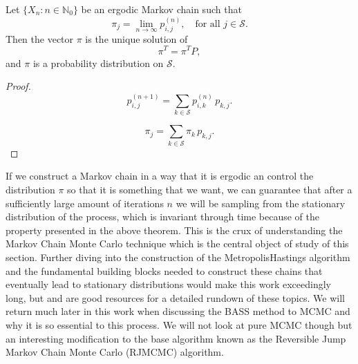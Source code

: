 \begin{theorem}
	Let $\{X_n : n \in \mathbb{N}_0\}$ be an ergodic Markov chain such that
	\[
	\pi_j = \lim_{n \to \infty} p_{i,j}^{(n)}, \quad \text{for all } j \in \mathcal{S}.
	\]
	Then the vector $\pi$ is the unique solution of
	\[
	\pi^T = \pi^T P,
	\]
	and $\pi$ is a probability distribution on $\mathcal{S}$.
\end{theorem}

\begin{proof}
	
	\[
	p_{i,j}^{(n+1)} = \sum_{k \in \mathcal{S}} p_{i,k}^{(n)}\, p_{k,j}.
	\]
	
	
	\[
	\pi_j = \sum_{k \in \mathcal{S}} \pi_k\, p_{k,j}.
	\]
	
	
	
	
\end{proof}

If we construct a Markov chain in a way that it is ergodic an control the distribution $\pi$ so that it is something that we want, we can guarantee that after a sufficiently large amount of iterations $n$ we will be sampling from the stationary distribution of the process, which is invariant through time because of the property presented in the above theorem. This is the crux of understanding the Markov Chain Monte Carlo technique which is the central object of study of this section. Further diving into the construction of the Metropolis\green{--}Hastings algorithm and the fundamental building blocks needed to construct these chains that eventually lead to stationary distributions  would make this work exceedingly long, but \cite{rubinstein2016simulation} and \cite{robert1999monte} are good resources for a detailed rundown of these topics. We will return much later in this work when discussing the BASS method to MCMC and why it is so essential to this process. We will not look at pure MCMC though but an interesting modification to the base algorithm known as the Reversible Jump Markov Chain Monte Carlo (RJMCMC) algorithm. 

